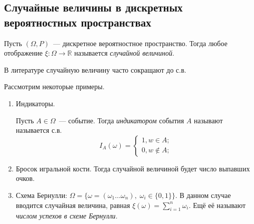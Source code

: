 \documentclass[a4paper,12pt]{article}
\begin{document}
	\subsection{Случайные величины в дискретных вероятностных пространствах}
	\begin{definition}
		Пусть \((\Omega, P)\)~--- дискретное вероятностное пространство. Тогда любое отображение \(\xi : \Omega \to \mathbb{R}\) называется \emph{случайной величиной}.
	\end{definition}
	\begin{remark}
		В литературе случайную величину часто сокращают до с.в.
	\end{remark}
	Рассмотрим некоторые примеры.
	\begin{enumerate}
		\item Индикаторы.
		\begin{definition}
			Пусть \(A\in \Omega\)~--- событие. Тогда \emph{индикатором} события \(A\) называют называется с.в.
			\[I_A(\omega) = \begin{cases}
			1, w \in A; \\
			0, w \not\in A;
			\end{cases}\]
		\end{definition}
		
		\item Бросок игральной кости. Тогда случайной величиной будет число выпавших очков.
		
		\item Схема Бернулли: \(\Omega = \{\omega = (\omega_1 \ldots \omega_n),\; \omega_i \in \{0, 1\} \}\). В данном случае вводится случайная величина, равная \(\xi(\omega) = \sum\limits_{i=1}^{n}\omega_i\). Ещё её называют \emph{числом успехов в схеме Бернулли}.
	\end{enumerate}
\end{document}
